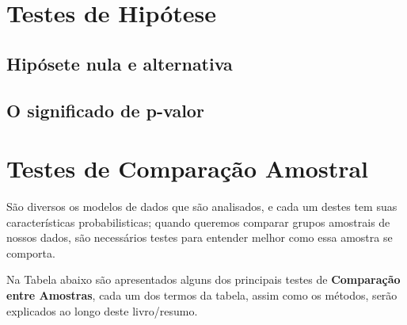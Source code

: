 \documentclass[
]{book}
\begin{document}
\hypertarget{testes-de-hipuxf3tese}{%
\section{Testes de Hipótese}\label{testes-de-hipuxf3tese}}

\hypertarget{hipuxf3sete-nula-e-alternativa}{%
\subsection{Hipósete nula e alternativa}\label{hipuxf3sete-nula-e-alternativa}}

\hypertarget{o-significado-de-p-valor}{%
\subsection{O significado de p-valor}\label{o-significado-de-p-valor}}

\hypertarget{testes-de-comparauxe7uxe3o-amostral}{%
\section{Testes de Comparação Amostral}\label{testes-de-comparauxe7uxe3o-amostral}}

São diversos os modelos de dados que são analisados, e cada um destes tem suas características probabilisticas; quando queremos comparar grupos amostrais de nossos dados, são necessários testes para entender melhor como essa amostra se comporta.

Na Tabela abaixo são apresentados alguns dos principais testes de \textbf{Comparação entre Amostras}, cada um dos termos da tabela, assim como os métodos, serão explicados ao longo deste livro/resumo.
\end{document}
